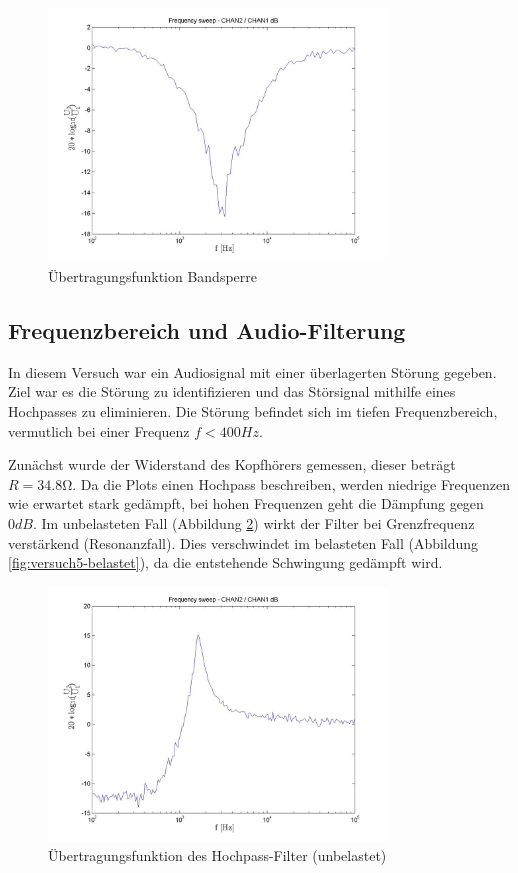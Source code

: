 \documentclass[a4paper]{article}
\begin{document}
\begin{figure}[H]
    \centering
    \includegraphics[width=0.8\textwidth]{versuch4/versuch4_uebertragungsfkt.jpg}
    \caption{Übertragungsfunktion Bandsperre}
    \label{fig:versuch4-uebertragungsfkt}
\end{figure}

\subsection{Frequenzbereich und Audio-Filterung}
\label{subsec:versuch5-audio}
In diesem Versuch war ein Audiosignal mit einer überlagerten Störung gegeben. Ziel war es die Störung zu identifizieren und das Störsignal mithilfe eines Hochpasses zu eliminieren.
Die Störung befindet sich im tiefen Frequenzbereich, vermutlich bei einer Frequenz $f<400\si{Hz}$.

\noindent Zunächst wurde der Widerstand des Kopfhörers gemessen, dieser beträgt $R=34.8\si{\ohm}$. Da die Plots einen Hochpass beschreiben, werden niedrige Frequenzen wie erwartet stark gedämpft, bei hohen Frequenzen geht die Dämpfung gegen $0\si{dB}$. Im unbelasteten Fall (Abbildung \ref{fig:versuch5-unbelastet}) wirkt der Filter bei Grenzfrequenz verstärkend (Resonanzfall). Dies verschwindet im belasteten Fall (Abbildung \ref{fig:versuch5-belastet}), da die entstehende Schwingung gedämpft wird.

\begin{figure}[H]
    \centering
    \includegraphics[width=0.8\textwidth]{versuch5/versuch5_unbelastet.jpg}
    \caption{Übertragungsfunktion des Hochpass-Filter (unbelastet)}
    \label{fig:versuch5-unbelastet}
\end{figure}
\end{document}
